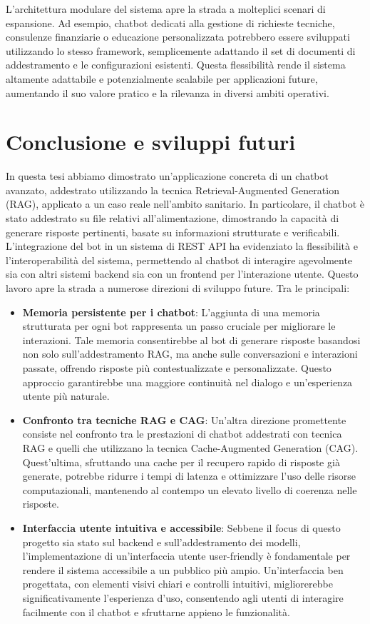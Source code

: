 \documentclass[a4paper,twoside,12pt]{toptesi}
\begin{document}
L'architettura modulare del sistema apre la strada a molteplici scenari di espansione. Ad esempio, chatbot dedicati alla gestione di richieste tecniche, consulenze finanziarie o educazione personalizzata potrebbero essere sviluppati utilizzando lo stesso framework, semplicemente adattando il set di documenti di addestramento e le configurazioni esistenti. Questa flessibilità rende il sistema altamente adattabile e potenzialmente scalabile per applicazioni future, aumentando il suo valore pratico e la rilevanza in diversi ambiti operativi.
 
\chapter{Conclusione e sviluppi futuri}
In questa tesi abbiamo dimostrato un'applicazione concreta di un chatbot avanzato, addestrato utilizzando la tecnica Retrieval-Augmented Generation (RAG), applicato a un caso reale nell'ambito sanitario. In particolare, il chatbot è stato addestrato su file relativi all'alimentazione, dimostrando la capacità di generare risposte pertinenti, basate su informazioni strutturate e verificabili. L'integrazione del bot in un sistema di REST API ha evidenziato la flessibilità e l'interoperabilità del sistema, permettendo al chatbot di interagire agevolmente sia con altri sistemi backend sia con un frontend per l'interazione utente. Questo lavoro apre la strada a numerose direzioni di sviluppo future. Tra le principali:
\begin{itemize}
\item \textbf{Memoria persistente per i chatbot}: L'aggiunta di una memoria strutturata per ogni bot rappresenta un passo cruciale per migliorare le interazioni. Tale memoria consentirebbe al bot di generare risposte basandosi non solo sull'addestramento RAG, ma anche sulle conversazioni e interazioni passate, offrendo risposte più contestualizzate e personalizzate. Questo approccio garantirebbe una maggiore continuità nel dialogo e un'esperienza utente più naturale.
\item \textbf{Confronto tra tecniche RAG e CAG}: Un'altra direzione promettente consiste nel confronto tra le prestazioni di chatbot addestrati con tecnica RAG e quelli che utilizzano la tecnica Cache-Augmented Generation (CAG). Quest'ultima, sfruttando una cache per il recupero rapido di risposte già generate, potrebbe ridurre i tempi di latenza e ottimizzare l'uso delle risorse computazionali, mantenendo al contempo un elevato livello di coerenza nelle risposte.
\item \textbf{Interfaccia utente intuitiva e accessibile}: Sebbene il focus di questo progetto sia stato sul backend e sull'addestramento dei modelli, l'implementazione di un'interfaccia utente user-friendly è fondamentale per rendere il sistema accessibile a un pubblico più ampio. Un'interfaccia ben progettata, con elementi visivi chiari e controlli intuitivi, migliorerebbe significativamente l'esperienza d'uso, consentendo agli utenti di interagire facilmente con il chatbot e sfruttarne appieno le funzionalità.
\end{itemize}
\end{document}
